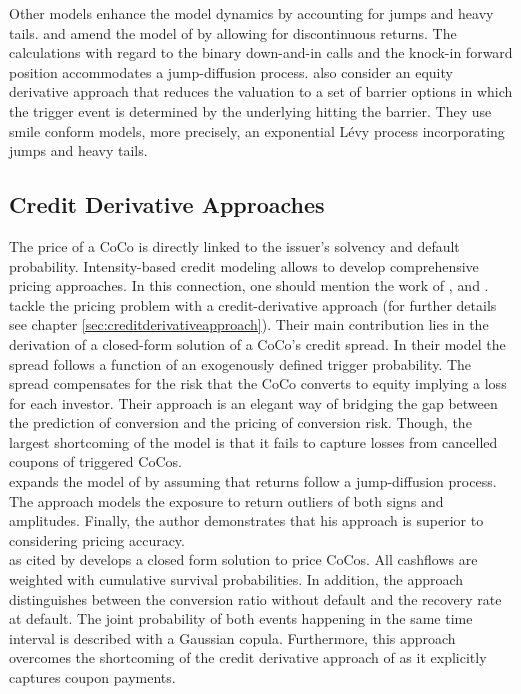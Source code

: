 Other models enhance the model dynamics by accounting for jumps and heavy tails. \citet{erismann2015pricing} and \citet{teneberg2012equity} amend the model of \citet{de2011pricing} by allowing for discontinuous returns. The calculations with regard to the binary down-and-in calls and the knock-in forward position accommodates a jump-diffusion process. \citet{corcuera2013pricing} also consider an equity derivative approach that reduces the valuation to a set of barrier options in which the trigger event is determined by the underlying hitting the barrier. They use smile conform models, more precisely, an exponential L\'{e}vy process incorporating jumps and heavy tails.

\subsection*{Credit Derivative Approaches}
The price of a CoCo is directly linked to the issuer's solvency and default probability. Intensity-based credit modeling allows to develop comprehensive pricing approaches. In this connection, one should mention the work of \citet{de2011pricing}, \citet{serjantov2011hybrid} and \citet{erismann2015pricing}. \\

\citet{de2011pricing} tackle the pricing problem with a credit-derivative approach (for further details see chapter \ref{sec:creditderivativeapproach}). Their main contribution lies in the derivation of a closed-form solution of a CoCo's credit spread. In their model the spread follows a function of an exogenously defined trigger probability. The spread compensates for the risk that the CoCo converts to equity implying a loss for each investor. Their approach is an elegant way of bridging the gap between the prediction of conversion and the pricing of conversion risk. Though, the largest shortcoming of the model is that it fails to capture losses from cancelled coupons of triggered CoCos.\\

\citet{erismann2015pricing} expands the model of \citet{de2011pricing} by assuming that returns follow a jump-diffusion process. The approach models the exposure to return outliers of both signs and amplitudes. Finally, the author demonstrates that his approach is superior to \citet{de2011pricing} considering pricing accuracy.\\

\citet{serjantov2011hybrid} as cited by \citet{wilkens2014contingent} develops a closed form solution to price CoCos. All cashflows are weighted with cumulative survival probabilities. In addition, the approach distinguishes between the conversion ratio without default and the recovery rate at default. The joint probability of both events happening in the same time interval is described with a Gaussian copula. Furthermore, this approach overcomes the shortcoming of the credit derivative approach of \citet{de2011pricing} as it explicitly captures coupon payments.

